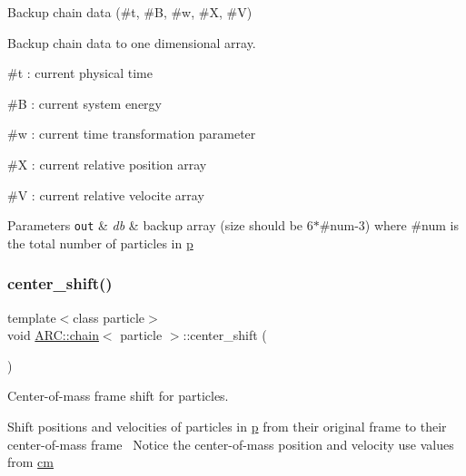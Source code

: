 Backup chain data (\#t, \#B, \#w, \#X, \#V) 

Backup chain data to one dimensional array.
\begin{DoxyItemize}
\item \#t \+: current physical time
\item \#B \+: current system energy
\item \#w \+: current time transformation parameter
\item \#X \+: current relative position array
\item \#V \+: current relative velocite array 
\begin{DoxyParams}[1]{Parameters}
\mbox{\tt out}  & {\em db} & backup array (size should be 6$\ast$\#num-\/3) where \#num is the total number of particles in \hyperlink{classARC_1_1chain_af1793b656e139e1f87c2e0a55f87514b}{p} \\
\hline
\end{DoxyParams}

\end{DoxyItemize}\hypertarget{classARC_1_1chain_a68ae268afb418455bfdd6e8101b3b4eb}{}\label{classARC_1_1chain_a68ae268afb418455bfdd6e8101b3b4eb} 
\subsubsection{\texorpdfstring{center\+\_\+shift()}{center\_shift()}}
{\footnotesize\ttfamily template$<$class particle$>$ \\
void \hyperlink{classARC_1_1chain}{A\+R\+C\+::chain}$<$ particle $>$\+::center\+\_\+shift (\begin{DoxyParamCaption}{ }\end{DoxyParamCaption})\hspace{0.3cm}{\ttfamily [inline]}}



Center-\/of-\/mass frame shift for particles. 

Shift positions and velocities of particles in \hyperlink{classARC_1_1chain_af1793b656e139e1f87c2e0a55f87514b}{p} from their original frame to their center-\/of-\/mass frame~\newline
Notice the center-\/of-\/mass position and velocity use values from \hyperlink{classARC_1_1chain_ae9f6a5cbf7aac2b33c7274e7e10916ed}{cm} \hypertarget{classARC_1_1chain_a52edc1843550578f5be5590b7403ef97}{}\label{classARC_1_1chain_a52edc1843550578f5be5590b7403ef97} 
